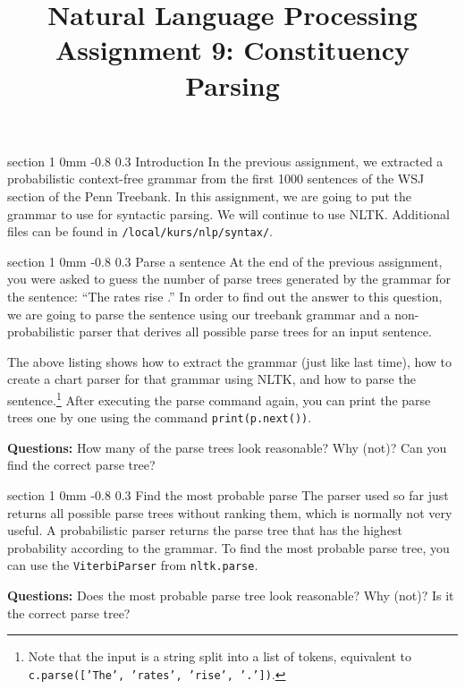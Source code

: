 \documentclass[11pt]{article}
\title{{\LARGE Natural Language Processing}\\[1.5mm]{\large Assignment 9: Constituency Parsing}}
\author{}
\date{} %
\makeatletter
\newcommand{\newsec}[2]{\section{#1}\label{sec:#2}\noindent}
\renewcommand{\section}{\@startsection
{section}%
{1}%
{0mm}%
{-0.8\baselineskip}%
{0.3\baselineskip}%
{\bfseries\large}}%
\makeatother
\begin{document}
 

\maketitle
\vspace{-2mm}
\newsec{Introduction}{intro}%
In the previous assignment, we extracted a probabilistic context-free grammar from the first 1000 sentences of the WSJ section of the Penn Treebank.
In this assignment, we are going to put the grammar to use for syntactic parsing. We will continue to use NLTK. 
Additional files can be found in {\tt /local/kurs/nlp/syntax/}.

\newsec{Parse a sentence}{chart}%
At the end of the previous assignment, you were asked to guess the number of parse trees generated by the grammar for the sentence: ``The rates rise .'' 
In order to find out the answer to this question, we are going to parse the sentence using our treebank grammar and a non-probabilistic parser that derives
all possible parse trees for an input sentence.
\begin{center}
\fbox{

}
\end{center}
The above listing shows how to extract the grammar (just like last time), how to create a chart parser for that grammar using NLTK,
and how to parse the sentence.\footnote{Note that the input is a string split into a list of tokens, equivalent to {\tt c.parse(['The', 'rates', 'rise', '.'])}.} 
After executing the parse command again, you can print the parse trees one by one using the command {\tt print(p.next())}.
\begin{center}
\fbox{

}
\end{center}
{\bf Questions:} How many of the parse trees look reasonable? Why (not)? Can you find the correct parse tree?

\newsec{Find the most probable parse}{viterbi}%
The parser used so far just returns all possible parse trees without ranking them, which is normally not very useful.  
A probabilistic parser returns the parse tree that has the highest probability according to the grammar. To find the most
probable parse tree, you can use the {\tt ViterbiParser} from {\tt nltk.parse}. 
\begin{center}
\fbox{

}
\end{center}
{\bf Questions:} Does the most probable parse tree look reasonable? Why (not)? Is it the correct parse tree?
\end{document}
